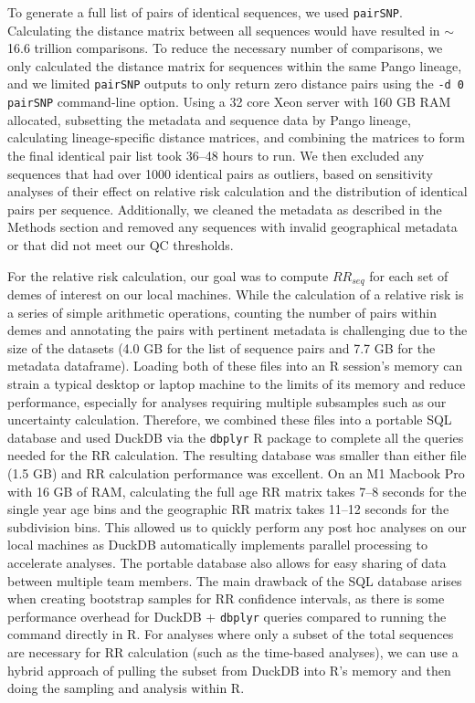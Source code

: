 \documentclass[11pt, letterpaper, oneside]{article}
\begin{document}
To generate a full list of pairs of identical sequences, we used \texttt{pairSNP}.\autocite{tonkin-hillGtonkinhillPairsnp2025}
Calculating the distance matrix between all sequences would have resulted in $\sim$16.6 trillion comparisons.
To reduce the necessary number of comparisons, we only calculated the distance matrix for sequences within the same Pango lineage,\autocite{aksamentovNextcladeCladeAssignment2021} and we limited \texttt{pairSNP} outputs to only return zero distance pairs using the \texttt{-d 0}  \texttt{pairSNP} command-line option.
Using a 32 core Xeon server with 160 GB RAM allocated, subsetting the metadata and sequence data by Pango lineage, calculating lineage-specific distance matrices, and combining the matrices to form the final identical pair list took 36--48 hours to run.
We then excluded any sequences that had over 1000 identical pairs as outliers, based on sensitivity analyses of their effect on relative risk calculation and the distribution of identical pairs per sequence.
Additionally, we cleaned the metadata as described in the Methods section and removed any sequences with invalid geographical metadata or that did not meet our QC thresholds.

For the relative risk calculation, our goal was to compute $RR_{seq}$ for each set of demes of interest on our local machines.
While the calculation of a relative risk is a series of simple arithmetic operations, counting the number of pairs within demes and annotating the pairs with pertinent metadata is challenging due to the size of the datasets (4.0 GB for the list of sequence pairs and 7.7 GB for the metadata dataframe).
Loading both of these files into an R session's memory can strain a typical desktop or laptop machine to the limits of its memory and reduce performance, especially for analyses requiring multiple subsamples such as our uncertainty calculation.
Therefore, we combined these files into a portable SQL database and used DuckDB via the \texttt{dbplyr} R package to complete all the queries needed for the RR calculation.
The resulting database was smaller than either file (1.5 GB) and RR calculation performance was excellent.
On an M1 Macbook Pro with 16 GB of RAM, calculating the full age RR matrix takes 7--8 seconds for the single year age bins and the geographic RR matrix takes 11--12 seconds for the subdivision bins.
This allowed us to quickly perform any post hoc analyses on our local machines as DuckDB automatically implements parallel processing to accelerate analyses.
The portable database also allows for easy sharing of data between multiple team members.
The main drawback of the SQL database arises when creating bootstrap samples for RR confidence intervals, as there is some performance overhead for DuckDB + \texttt{dbplyr} queries compared to running the command directly in R.
For analyses where only a subset of the total sequences are necessary for RR calculation (such as the time-based analyses), we can use a hybrid approach of pulling the subset from DuckDB into R's memory and then doing the sampling and analysis within R.
\end{document}
